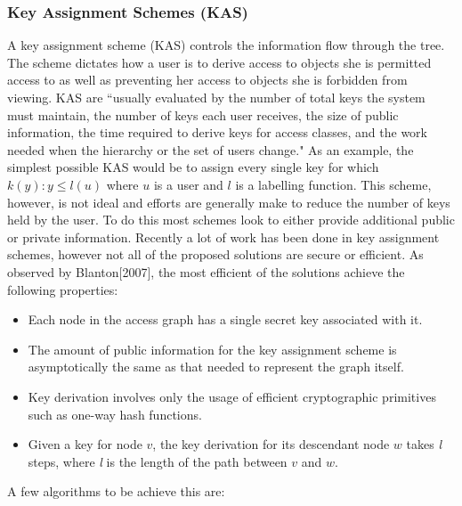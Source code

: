 \documentclass[12pt, titlepage]{article}
\begin{document}
\subsubsection{Key Assignment Schemes (KAS)}
A key assignment scheme (KAS) controls the information flow through the tree. The scheme dictates how a user is to derive access to objects she is permitted access to as well as preventing her access to objects she is forbidden from viewing. KAS are ``usually evaluated by the number of total keys the system must maintain, the number of keys each user receives, the size of public information, the time required to derive keys for access classes, and the work needed when the hierarchy or the set of users change.\cite{atallah2005}" As an example, the simplest possible KAS would be to assign every single key for which $k(y) : y\le l(u)$ where $u$ is a user and $l$ is a labelling function. This scheme, however, is not ideal and efforts are generally make to reduce the number of keys held by the user. To do this most schemes look to either provide additional public or private information. 
\newline \indent Recently a lot of work has been done in key assignment schemes, however not all of the proposed solutions are secure or efficient. As observed by Blanton[2007], the most efficient of the solutions achieve the following properties\cite{blanton2007}:
\begin{itemize}
\item Each node in the access graph has a single secret key associated with it.
\item The amount of public information for the key assignment scheme is asymptotically the same as that needed to represent the graph itself.
\item Key derivation involves only the usage of efficient cryptographic primitives such
as one-way hash functions.
\item Given a key for node $v$, the key derivation for its descendant node $w$ takes \textit{l} steps, where \textit{l} is the length of the path between $v$ and $w$.
\end{itemize}
 A few algorithms to be achieve this are:
\end{document}
